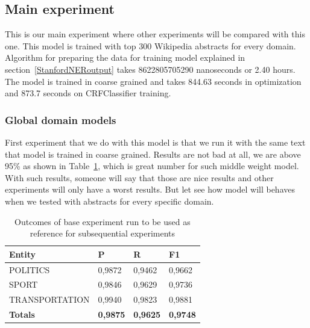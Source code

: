 \documentclass[thesis=M,english]{FITthesis}[2018/05/30]
\begin{document}
%	
\subsection{Main experiment}\label{MainExperiment}
This is our main experiment where other experiments will be compared with this one. This model is trained with top 300 Wikipedia abstracts for every domain. Algorithm for preparing the data for training model explained in section~\ref{StanfordNERoutput}  takes 8622805705290 nanoseconds or 2.40 hours. The model is trained in coarse grained and takes 844.63 seconds in optimization and 873.7 seconds on CRFClassifier training.

\subsubsection{Global domain models}
	First experiment that we do with this model is that we run it with the same text that model is trained in coarse grained. Results are not bad at all, we are above 95\% as shown in Table~\ref{table:All3domainsWithAll3DomiansTop300Coarse}, which is great number for such middle weight model. With such results, someone will say that those are nice results and other experiments will only have a worst results. But let see how model will behaves when we tested with abstracts for every specific domain.

	\begin{table}[H]\centering
		\begin{tabular}{|l|l|l|l|}
			\hline {\textbf{Entity}} & {\textbf{P}} & {\textbf{R}} & {\textbf{F1}}\\\hline
				POLITICS & 0,9872 & 0,9462 & 0,9662\\
				SPORT & 0,9846 & 0,9629 & 0,9736\\
				TRANSPORTATION & 0,9940 & 0,9823 & 0,9881\\\hline
				\textbf{Totals} & \textbf{0,9875} & \textbf{0,9625} & \textbf{0,9748}\\\hline
		\end{tabular}
		\caption{Outcomes of base experiment run to be used as reference for subsequential experiments \label{table:All3domainsWithAll3DomiansTop300Coarse}}
	\end{table}	
	
\end{document}
